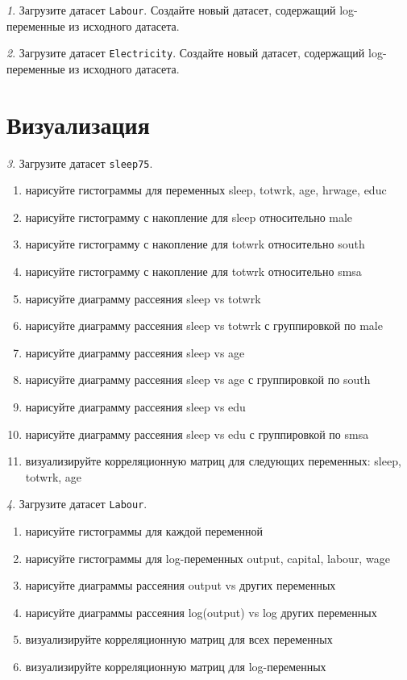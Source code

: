 \documentclass[12pt]{article}
\theoremstyle{remark}
\newtheorem{exercise}{}[section]
\begin{document}
\begin{exercise}
Загрузите датасет \texttt{Labour}. Создайте новый датасет, 
содержащий log-переменные из исходного датасета.
\end{exercise}

\begin{exercise}
Загрузите датасет \texttt{Electricity}. Создайте новый датасет, 
содержащий log-переменные из исходного датасета.
\end{exercise}

\section{Визуализация}

\begin{exercise}
Загрузите датасет \texttt{sleep75}.
\begin{enumerate}
	\item нарисуйте гистограммы для переменных sleep, totwrk, age, hrwage, educ
	\item нарисуйте гистограмму с накопление для sleep относительно male 
	\item нарисуйте гистограмму с накопление для totwrk относительно south 
	\item нарисуйте гистограмму с накопление для totwrk относительно smsa 
	\item нарисуйте диаграмму рассеяния sleep vs totwrk
	\item нарисуйте диаграмму рассеяния sleep vs totwrk с группировкой по male
	\item нарисуйте диаграмму рассеяния sleep vs age
	\item нарисуйте диаграмму рассеяния sleep vs age с группировкой по south
	\item нарисуйте диаграмму рассеяния sleep vs edu
	\item нарисуйте диаграмму рассеяния sleep vs edu с группировкой по smsa
	\item визуализируйте корреляционную матриц для следующих переменных: sleep, totwrk, age
\end{enumerate}
\end{exercise}

\begin{exercise}
Загрузите датасет \texttt{Labour}.
\begin{enumerate}
	\item нарисуйте гистограммы для каждой переменной
	\item нарисуйте гистограммы для log-переменных output, capital, labour, wage
	\item нарисуйте диаграммы рассеяния output vs других переменных
	\item нарисуйте диаграммы рассеяния log(output) vs log других переменных
	\item визуализируйте корреляционную матриц для всех переменных
	\item визуализируйте корреляционную матриц для log-переменных
\end{enumerate}
\end{exercise}
\end{document}

